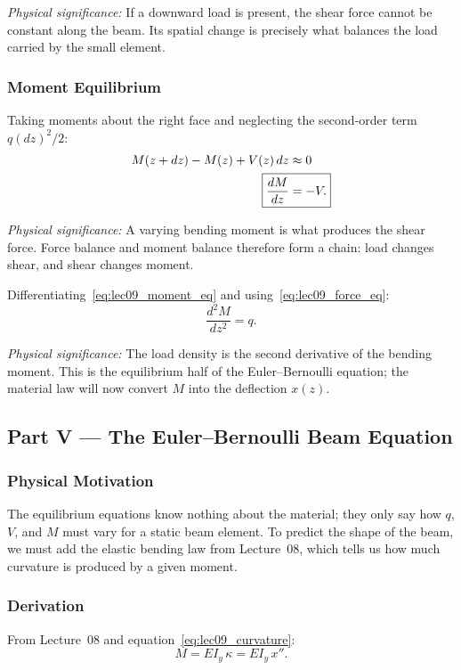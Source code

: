 \documentclass[../main.tex]{subfiles}
\begin{document}
\textit{Physical significance:} If a downward load is present, the shear force cannot be constant along the beam. Its spatial change is precisely what balances the load carried by the small element.

\subsubsection*{Moment Equilibrium}

Taking moments about the right face and neglecting the second-order term $q(dz)^2/2$:
\begin{align}
  M(z+dz) - M(z) + V(z)\,dz &\approx 0 \nonumber \\
  \Aboxed{\frac{dM}{dz} &= -V.}
  \label{eq:lec09_moment_eq}
\end{align}

\textit{Physical significance:} A varying bending moment is what produces the shear force. Force balance and moment balance therefore form a chain: load changes shear, and shear changes moment.

Differentiating~\eqref{eq:lec09_moment_eq} and using~\eqref{eq:lec09_force_eq}:
\begin{equation}
  \boxed{\frac{d^2 M}{dz^2} = q.}
  \label{eq:lec09_M2eq}
\end{equation}

\textit{Physical significance:} The load density is the second derivative of the bending moment. This is the equilibrium half of the Euler--Bernoulli equation; the material law will now convert $M$ into the deflection $x(z)$.

\subsection*{Part V — The Euler–Bernoulli Beam Equation}

\subsubsection*{Physical Motivation}
The equilibrium equations know nothing about the material; they only say how $q$, $V$, and $M$ must vary for a static beam element. To predict the shape of the beam, we must add the elastic bending law from Lecture~08, which tells us how much curvature is produced by a given moment.

\subsubsection*{Derivation}
From Lecture~08 and equation~\eqref{eq:lec09_curvature}:
\begin{equation}
  \boxed{M = E I_y\,\kappa = E I_y\,x''.}
  \label{eq:lec09_M_kappa}
\end{equation}
\end{document}
